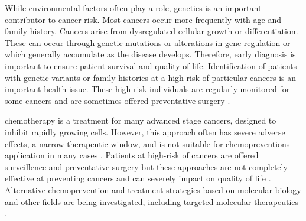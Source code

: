 While environmental factors often play a role, genetics is an important contributor to cancer risk. Most \glspl{cancer} occur more frequently with age and family history. Cancers arise from dysregulated cellular growth or differentiation. These can occur through genetic \glspl{mutation} or alterations in gene regulation or  which generally accumulate as the disease develops.
Therefore, early diagnosis is important to ensure patient survival and quality of life.
Identification of patients with genetic variants or family histories at a high-risk of particular cancers is an important health issue.
These high-risk individuals are regularly monitored for some cancers and are sometimes offered preventative surgery \citep{Scheuer2002, Guilford2010}. 

\Gls{chemotherapy} is a treatment for many advanced stage cancers, designed to inhibit rapidly growing cells. However, this approach often has severe adverse effects, a narrow therapeutic window, and is not suitable for \glspl{chemoprevention} application in many cases \citep{Kaelin2009}. Patients at high-risk of cancers are offered surveillence and preventative surgery but these approaches are not completely effective at preventing cancers and can severely impact on quality of life \citep{Guilford2010}. Alternative \gls{chemoprevention} and treatment strategies based on molecular biology and other fields are being investigated, including targeted molecular therapeutics \citep{Bozovic-Spasojevic2012}. %

